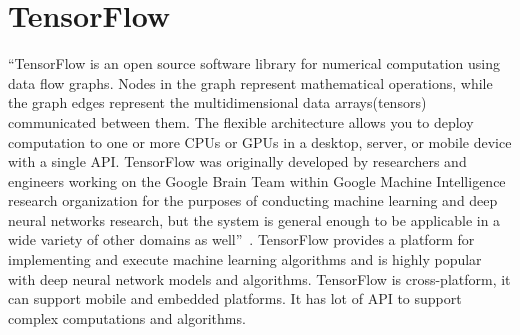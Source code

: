 \section{TensorFlow}

“TensorFlow is an open source software library for numerical computation using
data flow graphs. Nodes in the graph represent mathematical operations, while the 
graph edges represent the multidimensional data arrays(tensors) communicated 
between them. The flexible architecture allows you to deploy computation to one 
or more CPUs or GPUs in a desktop, server, or mobile device with a single API. 
TensorFlow was originally developed by researchers and engineers working on the 
Google Brain Team within Google Machine Intelligence research organization for 
the purposes of conducting machine learning and deep neural networks research, 
but the system is general enough to be applicable in a wide variety of other 
domains as well”~\cite{hid-sp18-520-TensorFlow}.
TensorFlow provides a platform for implementing and execute machine learning
algorithms and is highly popular with deep neural network models and algorithms.
TensorFlow is cross-platform, it can support mobile and embedded platforms. It has
lot of API to support complex computations and algorithms.
